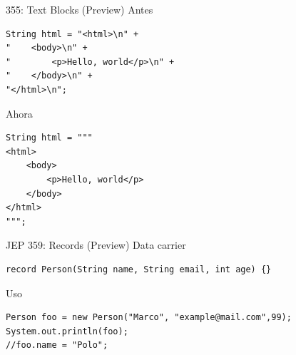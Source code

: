 \documentclass[aspectratio=169]{beamer}
\begin{document}
\begin{frame}[fragile]{355: Text Blocks (Preview)}
Antes
\begin{lstlisting}
String html = "<html>\n" +
"    <body>\n" +
"        <p>Hello, world</p>\n" +
"    </body>\n" +
"</html>\n";
\end{lstlisting}

Ahora
\begin{lstlisting}
String html = """
<html>
    <body>
        <p>Hello, world</p>
    </body>
</html>
""";
\end{lstlisting}
\end{frame}

\begin{frame}[fragile]{JEP 359: Records (Preview)}
Data carrier
\begin{lstlisting}
record Person(String name, String email, int age) {}
\end{lstlisting}

Uso
\begin{lstlisting}
Person foo = new Person("Marco", "example@mail.com",99);
System.out.println(foo);
//foo.name = "Polo";
\end{lstlisting}
\end{frame}
\end{document}
